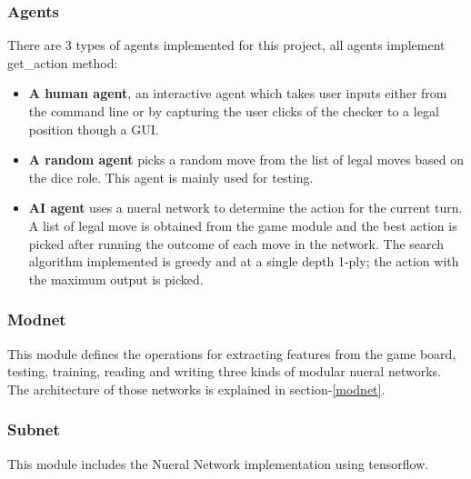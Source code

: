 \documentclass[12pt,a4paper]{article}
\begin{document}
\subsubsection{Agents}
There are 3 types of agents implemented for this project, all agents implement get\_action method: 
\begin{itemize}
    \item \textbf{A human agent}, an interactive agent which takes user inputs either from the command line or by capturing the user clicks of the checker to a legal position though a GUI.
    \item \textbf{A random agent} picks a random move from the list of legal moves based on the dice role. This agent is mainly used for testing.
    \item \textbf{AI agent} uses a nueral network to determine the action for the current turn. A list of legal move is obtained from the game module and the best action is picked after running the outcome of each move in the network. The search algorithm implemented is greedy and at a single depth 1-ply; the action with the maximum output is picked.
\end{itemize}

\subsubsection{Modnet}
This module defines the operations for extracting features from the game board, testing, training, reading and writing three kinds of modular nueral networks. The architecture of those networks is explained in section-\ref{modnet}. 

\subsubsection{Subnet}
This module includes the Nueral Network implementation using tensorflow.
\end{document}
